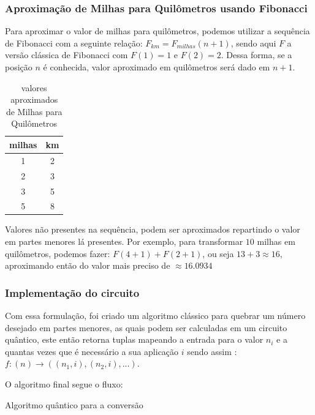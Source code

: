 \documentclass{article}
\begin{document}
\subsubsection{Aproximação de Milhas para Quilômetros usando Fibonacci}

Para aproximar o valor de milhas para quilômetros, podemos utilizar a sequência de Fibonacci com a seguinte relação: $F_{km} = F_{milhas}(n+1)$, sendo aqui $F$ a versão clássica de Fibonacci com $F(1) = 1$ e $F(2) = 2$. Dessa forma, se a posição $n$ é conhecida, valor aproximado em quilômetros será dado em $n+1$.


\begin{table}[!h]
	\begin{center}
		\begin{tabular}{ |c|c| } 
			\hline
			milhas & km \\
			\hline
			1 & 2 \\
			\hline
			2 & 3 \\
			\hline
			3 & 5 \\
			\hline
			5 & 8 \\
			\hline
		\end{tabular}
	\caption{valores aproximados de Milhas para Quilômetros}
	\end{center}
\end{table}

Valores não presentes na sequência, podem ser aproximados repartindo o valor em partes menores lá presentes. Por exemplo, para transformar $10$ milhas em quilômetros, podemos fazer: $F(4+1) + F(2+1)$, ou seja $13 + 3 \approx 16$, aproximando então do valor mais preciso de $\approx 16.0934$


\subsubsection{Implementação do circuito}

Com essa formulação, foi criado um algoritmo clássico para quebrar um número desejado em partes menores, as quais podem ser calculadas em um circuito quântico, este então retorna tuplas mapeando a entrada para o valor $n_i$ e a quantas vezes que é necessário a sua aplicação $i$ sendo assim : $ f: (n) \to ((n_1, i), (n_2, i), ...)$.

O algoritmo final segue o fluxo:

\begin{algorithm}
	\begin{algorithmic}
		\EndFor
		
	\end{algorithmic}
	\caption{Algoritmo quântico para a conversão}
	\label{alg:miles-to-km-quantum-algortihm}
\end{algorithm}
\end{document}
